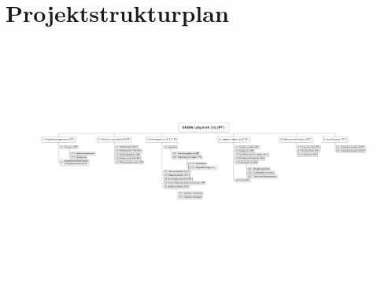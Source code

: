 
\chapter{Projektstrukturplan}
\begin{landscape}
	\begin{figure}[H]
	\centering
	\includegraphics[scale=0.75]{images/projektstrukturplan.pdf}
	\end{figure}
\end{landscape}

